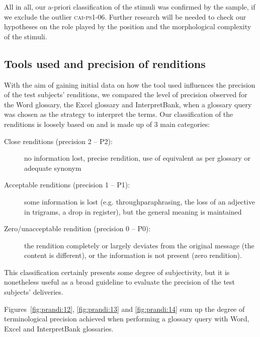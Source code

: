\documentclass[output=paper]{langsci/langscibook}
\begin{document}
All in all, our a-priori classification of the stimuli was confirmed by the sample, if we exclude the outlier \textsc{cai}-\textsc{ps1-06}. Further research will be needed to check our hypotheses on the role played by the position and the morphological complexity of the stimuli.


\subsection{Tools used and precision of renditions}\label{sec:prandi:5.2}

With the aim of gaining initial data on how the tool used influences the precision of the test subjects’ renditions, we compared the level of precision observed for the Word glossary, the Excel glossary and InterpretBank, when a glossary query was chosen as the strategy to interpret the terms. Our classification of the renditions is loosely based on \citet{Wadensjö1998} and is made up of 3 main categories:

\begin{description}
\item[Close renditions (precision 2 – P2):] no information lost, precise rendition, use of equivalent as per glossary or adequate synonym
\item[Acceptable renditions (precision 1 – P1):] some information is lost (e.g. through\linebreak paraphrasing, the loss of an adjective in trigrams, a drop in register), but the general meaning is maintained
\item[Zero/unacceptable rendition (precision 0 – P0):] the rendition completely or largely deviates from the original message (the content is different), or the information is not present (zero rendition).
\end{description}

This classification certainly presents some degree of subjectivity, but it is none\-theless useful as a broad guideline to evaluate the precision of the test subjects’ deliveries.

Figures~\ref{fig:prandi:12}, \ref{fig:prandi:13} and \ref{fig:prandi:14} sum up the degree of terminological precision achieved when performing a glossary query with Word, Excel and InterpretBank glossaries. 
\end{document}
